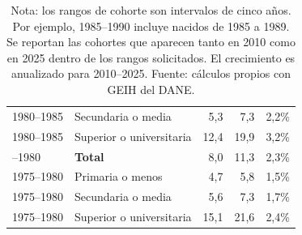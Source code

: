 \begin{table}[H]
\begin{tabular}{@{}p{2.0cm}p{3.5cm}rrr@{}}
1980--1985 & Secundaria o media & 5,3 & 7,3 & 2,2\% \\
1980--1985 & Superior o universitaria & 12,4 & 19,9 & 3,2\% \\
\addlinespace[0.4em]
1975--1980 & \textbf{Total} & 8,0 & 11,3 & 2,3\% \\
1975--1980 & Primaria o menos & 4,7 & 5,8 & 1,5\% \\
1975--1980 & Secundaria o media & 5,6 & 7,3 & 1,7\% \\
1975--1980 & Superior o universitaria & 15,1 & 21,6 & 2,4\% \\
\bottomrule
\end{tabular}
\caption*{\footnotesize Nota: los rangos de cohorte son intervalos de cinco años. Por ejemplo, 1985--1990 incluye nacidos de 1985 a 1989. Se reportan las cohortes que aparecen tanto en 2010 como en 2025 dentro de los rangos solicitados. El crecimiento es anualizado para 2010--2025. Fuente: cálculos propios con GEIH del DANE.}
\end{table}
